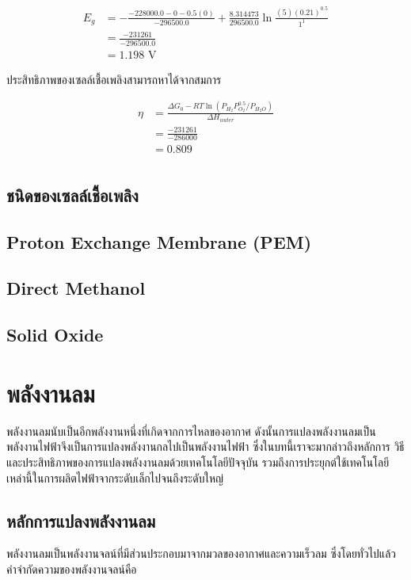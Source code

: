 \documentclass[a4paper,nobib,openany]{tufte-book}
\begin{document}
\begin{align*}
E_g &= - \frac{-228000.0-0- 0.5(0)}{-296500.0} + \frac{8.314473}{296500.0} \ln \frac{(5)(0.21)^{0.5}}{1^1} \\
&= \frac{-231261}{-296500.0} \\
&= 1.198\text{ V}
\end{align*}

ประสิทธิภาพของเซลล์เชื้อเพลิงสามารถหาได้จากสมการ

\begin{align*}
\eta &= \frac{\Delta G_0 - RT \ln (P_{H_2} P_{O_2}^{0.5}/ P_{H_2O})}{\Delta H_{water}} \\
&= \frac{-231261}{-286000} \\ 
&=0.809\\
\end{align*}

\section{ชนิดของเซลล์เชื้อเพลิง}
\label{sec:org6154804}
\section{Proton Exchange Membrane (PEM)}
\label{sec:orgd788c27}
\section{Direct Methanol}
\label{sec:orgb0b7ef3}
\section{Solid Oxide}
\label{sec:org68f1e2e}
\chapter{พลังงานลม}
\label{sec:org854c52c}
พลังงานลมนับเป็นอีกพลังงานหนึ่งที่เกิดจากการไหลของอากาศ
ดังนั้นการแปลงพลังงานลมเป็นพลังงานไฟฟ้าจึงเป็นการแปลงพลังงานกลไปเป็นพลังงานไฟฟ้า
ซึ่งในบทนี้เราจะมากล่าวถึงหลักการ วิธี
และประสิทธิภาพของการแปลงพลังงานลมด้วยเทคโนโลยีปัจจุบัน
รวมถึงการประยุกต์ใช้เทคโนโลยีเหล่านี้ในการผลิตไฟฟ้าจากระดับเล็กไปจนถึงระดับใหญ่

\section{หลักการแปลงพลังงานลม}
\label{sec:org25f1d08}
พลังงานลมเป็นพลังงานจลน์ที่มีส่วนประกอบมาจากมวลของอากาศและความเร็วลม
ซึ่งโดยทั่วไปแล้ว คำจำกัดความของพลังงานจลน์คือ
\end{document}
